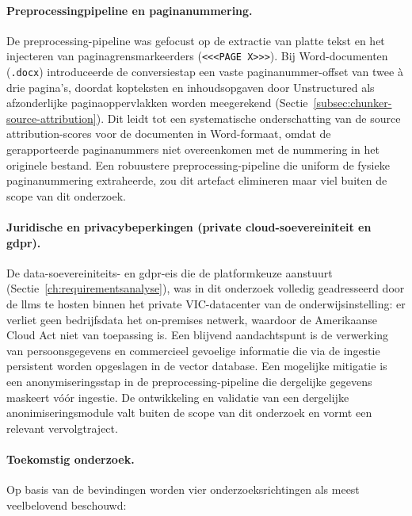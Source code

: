\paragraph{Preprocessingpipeline en paginanummering.}
De preprocessing-pipeline was gefocust op de extractie van platte tekst en het injecteren van paginagrensmarkeerders (\texttt{<<<PAGE X>>>}). Bij Word-documenten (\texttt{.docx}) introduceerde de conversiestap een vaste paginanummer-offset van twee à drie pagina's, doordat kopteksten en inhoudsopgaven door Unstructured als afzonderlijke paginaoppervlakken worden meegerekend (Sectie~\ref{subsec:chunker-source-attribution}). Dit leidt tot een systematische onderschatting van de source attribution-scores voor de documenten in Word-formaat, omdat de gerapporteerde paginanummers niet overeenkomen met de nummering in het originele bestand. Een robuustere preprocessing-pipeline die uniform de fysieke paginanummering extraheerde, zou dit artefact elimineren maar viel buiten de scope van dit onderzoek.

\paragraph{Juridische en privacybeperkingen (private cloud-soevereiniteit en \gls{gdpr}).}
De data-soevereiniteits- en \gls{gdpr}-eis die de platformkeuze aanstuurt (Sectie~\ref{ch:requirementsanalyse}), was in dit onderzoek volledig geadresseerd door de \glspl{llm} te hosten binnen het private VIC-datacenter van de onderwijsinstelling: er verliet geen bedrijfsdata het on-premises netwerk, waardoor de Amerikaanse Cloud Act niet van toepassing is. Een blijvend aandachtspunt is de verwerking van persoonsgegevens en commercieel gevoelige informatie die via de ingestie persistent worden opgeslagen in de vector database. Een mogelijke mitigatie is een anonymiseringsstap in de preprocessing-pipeline die dergelijke gegevens maskeert vóór ingestie. De ontwikkeling en validatie van een dergelijke anonimiseringsmodule valt buiten de scope van dit onderzoek en vormt een relevant vervolgtraject.

\paragraph{Toekomstig onderzoek.}
Op basis van de bevindingen worden vier onderzoeksrichtingen als meest veelbelovend beschouwd:

